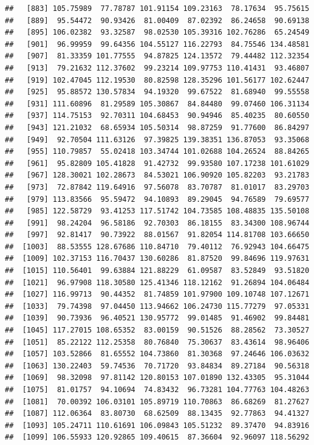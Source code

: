 \documentclass[
]{article}
\begin{document}
\begin{verbatim}
##   [883] 105.75989  77.78787 101.91154 109.23163  78.17634  95.75615
##   [889]  95.54472  90.93426  81.00409  87.02392  86.24658  90.69138
##   [895] 106.02382  93.32587  98.02530 105.39316 102.76286  65.24549
##   [901]  96.99959  99.64356 104.55127 116.22793  84.75546 134.48581
##   [907]  81.33359 101.77555  94.87825 124.13572  79.44482 112.32354
##   [913]  79.21632 112.37602  99.23214 109.97753 110.41431  93.46807
##   [919] 102.47045 112.19530  80.82598 128.35296 101.56177 102.62447
##   [925]  95.88572 130.57834  94.19320  99.67522  81.68940  99.55558
##   [931] 111.60896  81.29589 105.30867  84.84480  99.07460 106.31134
##   [937] 114.75153  92.70311 104.68453  90.94946  85.40235  80.60550
##   [943] 121.21032  68.65934 105.50314  98.87259  91.77600  86.84297
##   [949]  92.70504 111.63126  97.39825 139.38351 136.87053  93.35068
##   [955] 110.79857  55.02418 103.34744 101.02688 104.26524  88.84265
##   [961]  95.82809 105.41828  91.42732  99.93580 107.17238 101.61029
##   [967] 128.30021 102.28673  84.53021 106.90920 105.82203  93.21783
##   [973]  72.87842 119.64916  97.56078  83.70787  81.01017  83.29703
##   [979] 113.83566  95.59472  94.10893  89.29045  94.76589  79.69577
##   [985] 122.58729  93.41253 117.51742 104.73585 108.48835 135.50108
##   [991]  98.24204  96.58186  92.70303  86.18155  83.34300 108.96744
##   [997]  92.81417  90.73922  88.01567  91.82054 114.81708 103.66650
##  [1003]  88.53555 128.67686 110.84710  79.40112  76.92943 104.66475
##  [1009] 102.37153 116.70437 130.60286  81.87520  99.84696 119.97631
##  [1015] 110.56401  99.63884 121.88229  61.09587  83.52849  93.51820
##  [1021]  96.97908 118.30580 125.41346 118.12162  91.26894 104.06484
##  [1027] 116.99713  90.44352  81.74859 101.97900 109.10748 107.12671
##  [1033]  79.74398  97.04450 113.94662 106.24730 115.77279  97.05331
##  [1039]  90.73936  96.40521 130.95772  99.01485  91.46902  99.84481
##  [1045] 117.27015 108.65352  83.00159  90.51526  88.28562  73.30527
##  [1051]  85.22122 112.25358  80.76840  75.30637  83.43614  98.96406
##  [1057] 103.52866  81.65552 104.73860  81.30368  97.24646 106.03632
##  [1063] 130.22403  59.74536  70.71720  93.84834  89.27184  90.56318
##  [1069]  98.32098  97.81142 120.80153 107.01890 132.43305  95.31044
##  [1075]  81.01757  94.10694  74.83432  96.73281 104.77763 104.48263
##  [1081]  70.00392 106.03101 105.89719 110.70863  86.68269  81.27627
##  [1087] 112.06364  83.80730  68.62509  88.13435  92.77863  94.41327
##  [1093] 105.24711 110.61691 106.09843 105.51232  89.37470  94.83916
##  [1099] 106.55933 120.92865 109.40615  87.36604  92.96097 118.56292

\end{verbatim}
\end{document}
